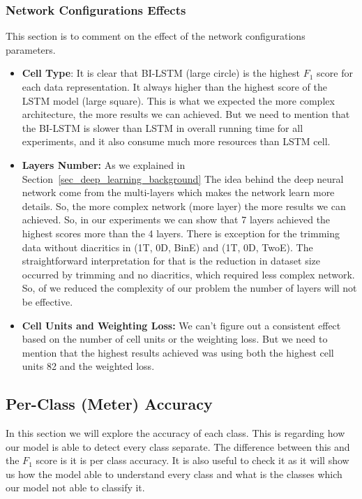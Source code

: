   
\subsubsection{Network Configurations Effects} 

This section is to comment on the effect of the network configurations parameters.
\begin{itemize}
\item \textbf{Cell Type}: It is clear that BI-LSTM  (large circle) is the highest $F_1$ score for each data representation. It always higher than the highest score of the LSTM model (large square). This is what we expected the more complex architecture, the more results we can achieved. But we need to mention that the BI-LSTM is slower than LSTM in overall running time for all experiments, and it also consume much more resources than LSTM cell.
\item \textbf{Layers Number:} As we explained in Section~\ref{sec_deep_learning_background} The idea behind the deep neural network come from the multi-layers which makes the network learn more details. So, the more complex network (more layer) the more results we can achieved. So, in our experiments we can show that 7 layers achieved the highest scores more than the 4 layers. There is exception for the trimming data without diacritics in (1T, 0D, BinE) and (1T, 0D, TwoE). The straightforward interpretation for that is the reduction in dataset size occurred by trimming and no diacritics, which required less complex network. So, of we reduced the complexity of our problem the number of layers will not be effective.

\item \textbf{Cell Units and Weighting Loss:} We can't figure out a consistent effect based on the number of cell units or the weighting loss. But we need to mention that the highest results achieved was using both the highest cell units 82 and the weighted loss.
  \end{itemize}



\subsection{Per-Class (Meter) Accuracy}

In this section we will explore the accuracy of each class. This is regarding how our model is able to detect every class separate. The difference between this and the $F_1$ score is it is per class accuracy. It is also useful to check it as it will show us how the model able to understand every class and what is the classes which our model not able to classify it. 

